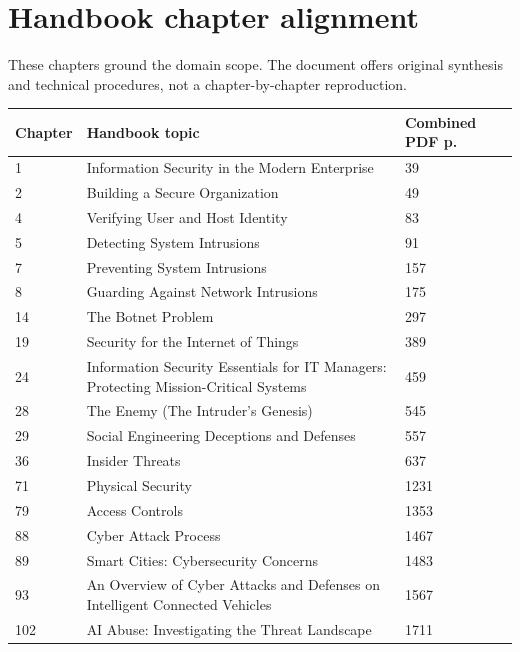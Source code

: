 \documentclass[10pt,letterpaper,oneside]{article}
\begin{document}
\section*{Handbook chapter alignment}
These chapters ground the domain scope. The document offers original synthesis and technical procedures, not a chapter-by-chapter reproduction.
\par\medskip\noindent\begin{longtable}{@{}p{}p{}p{}@{}}\toprule Chapter & Handbook topic & Combined PDF p. \\ \midrule\endhead1 & Information Security in the Modern Enterprise & 39 \\
2 & Building a Secure Organization & 49 \\
4 & Verifying User and Host Identity & 83 \\
5 & Detecting System Intrusions & 91 \\
7 & Preventing System Intrusions & 157 \\
8 & Guarding Against Network Intrusions & 175 \\
14 & The Botnet Problem & 297 \\
19 & Security for the Internet of Things & 389 \\
24 & Information Security Essentials for IT Managers: Protecting Mission-Critical Systems & 459 \\
28 & The Enemy (The Intruder's Genesis) & 545 \\
29 & Social Engineering Deceptions and Defenses & 557 \\
36 & Insider Threats & 637 \\
71 & Physical Security & 1231 \\
79 & Access Controls & 1353 \\
88 & Cyber Attack Process & 1467 \\
89 & Smart Cities: Cybersecurity Concerns & 1483 \\
93 & An Overview of Cyber Attacks and Defenses on Intelligent Connected Vehicles & 1567 \\
102 & AI Abuse: Investigating the Threat Landscape & 1711 \\
\bottomrule\end{longtable}\par\medskip
\end{document}
